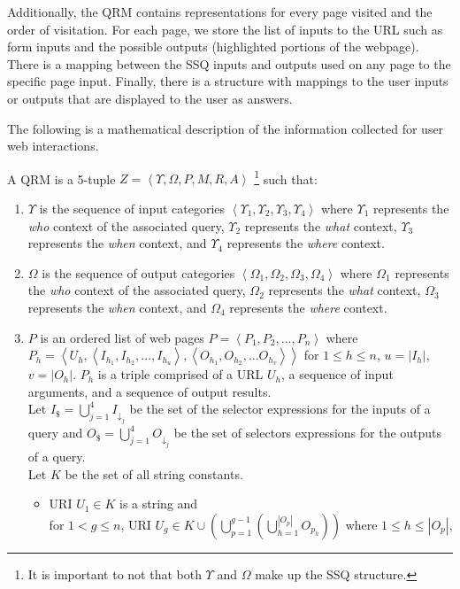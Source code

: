 Additionally, the QRM contains representations for every page visited and the order of visitation.  For each page, we store the list of inputs to the URL such as form inputs and the possible outputs (highlighted portions of the webpage).  There is a mapping between the SSQ inputs and outputs used on any page to the specific page input.  Finally, there is a structure with mappings to the user inputs or outputs that are displayed to the user as answers.

The following is a mathematical description of the information collected for user web interactions.

A QRM is a 5-tuple $Z = \left< \Upsilon, \Omega, P, M, R, A \right>$ \footnote{It is important to not that both $\Upsilon$ and $\Omega$ make up the SSQ structure.} such that:

\begin{enumerate}
\item $\Upsilon$ is the sequence of input categories $\left<
  \Upsilon_{1}, \Upsilon_{2}, \Upsilon_{3}, \Upsilon_{4} \right>$
  where $\Upsilon_{1}$ represents the \emph{who} context of the
  associated query, $\Upsilon_{2}$ represents the \emph{what} context,
  $\Upsilon_{3}$ represents the \emph{when} context, and
  $\Upsilon_{4}$ represents the \emph{where} context.

\item $\Omega$ is the sequence of output categories $\left<\Omega_{1},
  \Omega_{2}, \Omega_{3}, \Omega_{4}\right>$ where $\Omega_{1}$
  represents the \emph{who} context of the associated query,
  $\Omega_{2}$ represents the \emph{what} context, $\Omega_{3}$
  represents the \emph{when} context, and $\Omega_{4}$ represents the
  \emph{where} context.

\item $P$ is an ordered list of web pages $P = \left<P_1,P_2,...,
  P_n\right>$ where $P_h =
  \left<U_h,\left<I_{h_1},I_{h_2},...,I_{h_u}\right>,\left<O_{h_1},O_{h_2},...O_{h_v}\right>\right>$
  for $1 \leq h \leq n$, $u = \left| I_h \right|$, $v = \left| O_h
  \right|$. $P_h$ is a triple comprised of a URL $U_h$, a sequence of
  input arguments, and a sequence of output results.  \\ Let $I_{\$} =
  \bigcup_{j=1}^{4} I_{\downarrow_j}$ be the set of the selector
  expressions for the inputs of a query and $O_{\$} =
  \bigcup_{j=1}^{4} O_{\downarrow_j}$ be the set of selectors
  expressions for the outputs of a query.  \\ Let $K$ be the set of
  all string constants.
\begin{itemize}
\item URI $U_1 \in K$ is a string and \\ for $1 < g \leq n$, URI $U_g
  \in K \cup \left( \bigcup^{g-1}_{p=1} \left(
  \bigcup^{\left|O_p\right|}_{h=1}O_{p_h} \right)\right)$ where $1
  \leq h \leq \left| O_p \right| $,


\end{itemize}
\end{enumerate}
